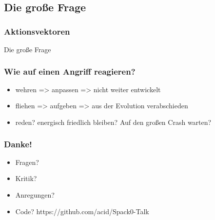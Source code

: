 \documentclass{beamer}
\begin{document}
\subsection{Die große Frage}

\frame
{
  \frametitle{Aktionsvektoren}
  Die große Frage
}
\frame
{
  \frametitle{Wie auf einen Angriff reagieren?}
  
  \begin{itemize}[<+->]
  \item wehren => anpassen => nicht weiter entwickelt
  \item fliehen => aufgeben => aus der Evolution verabschieden
  \item reden? energisch friedlich bleiben? Auf den großen Crash warten?
  \end{itemize}

}
\frame
{
  \frametitle{Danke!}
  
  \begin{itemize}
  \item Fragen?
  \item Kritik?
  \item Anregungen?
  \item Code? https://github.com/acid/Spack0-Talk
  \end{itemize}

}
\end{document}
